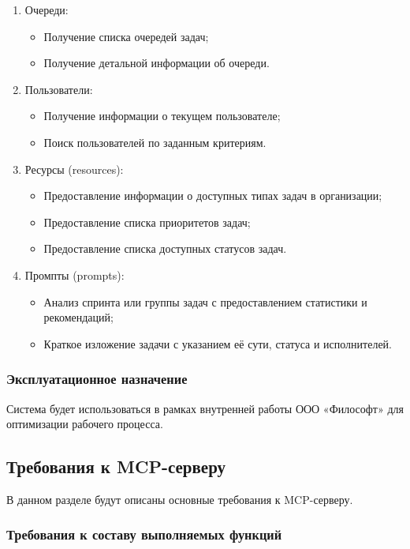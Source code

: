 \documentclass[utf8, russian]{eskdtext}
\begin{document}
\begin{enumerate}
\item{ Очереди:}
\begin{itemize}
    \item Получение списка очередей задач;
    \item Получение детальной информации об очереди.
\end{itemize}

\item{ Пользователи:}
\begin{itemize}
    \item Получение информации о текущем пользователе;
    \item Поиск пользователей по заданным критериям.
\end{itemize}

\item{ Ресурсы (resources):}
\begin{itemize}
    \item Предоставление информации о доступных типах задач в организации;
    \item Предоставление списка приоритетов задач;
    \item Предоставление списка доступных статусов задач.
\end{itemize}

\item{ Промпты (prompts):}
\begin{itemize}
    \item Анализ спринта или группы задач с предоставлением статистики и рекомендаций;
    \item Краткое изложение задачи с указанием её сути, статуса и исполнителей.
\end{itemize}
\end{enumerate}

\subsubsection{Эксплуатационное назначение}
Система будет использоваться в рамках внутренней работы ООО «Философт» для оптимизации рабочего процесса.

\subsection{Требования к MCP-серверу}
В данном разделе будут описаны основные требования к MCP-серверу.
\subsubsection{Требования к составу выполняемых функций}
\end{document}
